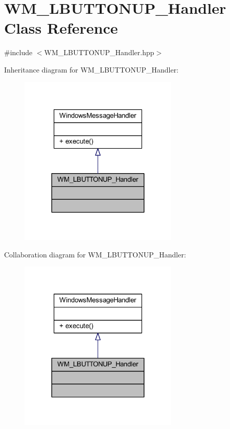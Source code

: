 \hypertarget{class_w_m___l_b_u_t_t_o_n_u_p___handler}{}\section{W\+M\+\_\+\+L\+B\+U\+T\+T\+O\+N\+U\+P\+\_\+\+Handler Class Reference}
\label{class_w_m___l_b_u_t_t_o_n_u_p___handler}


{\ttfamily \#include $<$W\+M\+\_\+\+L\+B\+U\+T\+T\+O\+N\+U\+P\+\_\+\+Handler.\+hpp$>$}



Inheritance diagram for W\+M\+\_\+\+L\+B\+U\+T\+T\+O\+N\+U\+P\+\_\+\+Handler\+:\nopagebreak
\begin{figure}[H]
\begin{center}
\leavevmode
\includegraphics[width=215pt]{class_w_m___l_b_u_t_t_o_n_u_p___handler__inherit__graph}
\end{center}
\end{figure}


Collaboration diagram for W\+M\+\_\+\+L\+B\+U\+T\+T\+O\+N\+U\+P\+\_\+\+Handler\+:\nopagebreak
\begin{figure}[H]
\begin{center}
\leavevmode
\includegraphics[width=215pt]{class_w_m___l_b_u_t_t_o_n_u_p___handler__coll__graph}
\end{center}
\end{figure}
